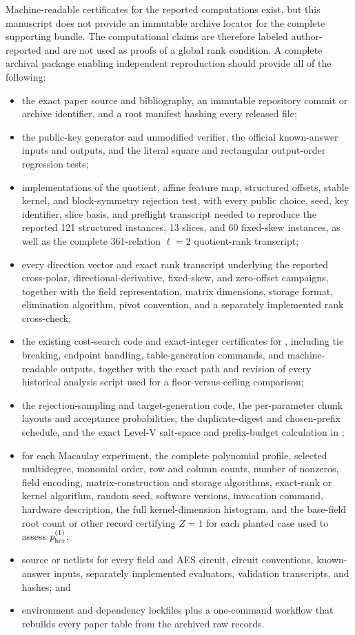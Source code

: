 \documentclass[11pt]{article}
\begin{document}
Machine-readable certificates for the reported computations exist, but this
manuscript does not provide an immutable archive locator for the complete
supporting bundle.  The computational claims are therefore labeled
author-reported and are not used as proofs of a global rank condition.  A
complete archival package enabling independent reproduction should provide
all of the following:
\begin{itemize}
\item the exact paper source and bibliography, an immutable repository commit
or archive identifier, and a root manifest hashing every released file;
\item the public-key generator and unmodified verifier, the official
known-answer inputs and outputs, and the literal square and rectangular
output-order regression tests;
\item implementations of the quotient, affine feature map, structured offsets,
stable kernel, and block-symmetry rejection test, with every public choice, seed, key
identifier, slice basis, and preflight transcript needed to reproduce the
reported 121 structured instances, 13 slices, and 60 fixed-skew instances,
as well as the complete 361-relation $\ell=2$ quotient-rank transcript;
\item every direction vector and exact rank transcript underlying the reported
cross-polar, directional-derivative, fixed-skew, and zero-offset campaigns,
together with the field representation, matrix dimensions, storage format,
elimination algorithm, pivot convention, and a separately implemented rank
cross-check;
\item the existing cost-search code and exact-integer certificates for
, including tie
breaking, endpoint handling, table-generation commands, and machine-readable
outputs, together with the exact path and revision of every historical
analysis script used for a floor-versus-ceiling comparison;
\item the rejection-sampling and target-generation code, the per-parameter
chunk layouts and acceptance probabilities, the duplicate-digest and
chosen-prefix schedule, and the exact Level-V salt-space and prefix-budget
calculation in ;
\item for each Macaulay experiment, the complete polynomial profile, selected
multidegree, monomial order, row and column counts, number of nonzeros, field
encoding, matrix-construction and storage algorithms, exact-rank or
kernel algorithm, random seed, software versions, invocation command,
hardware description, the full kernel-dimension histogram, and the
base-field root count or other record certifying $Z=1$ for each planted case
used to assess $p_{\rm ker}^{(1)}$;
\item source or netlists for every field and AES circuit, circuit conventions,
known-answer inputs, separately implemented evaluators, validation
transcripts, and hashes; and
\item environment and dependency lockfiles plus a one-command workflow that
rebuilds every paper table from the archived raw records.
\end{itemize}
\end{document}
